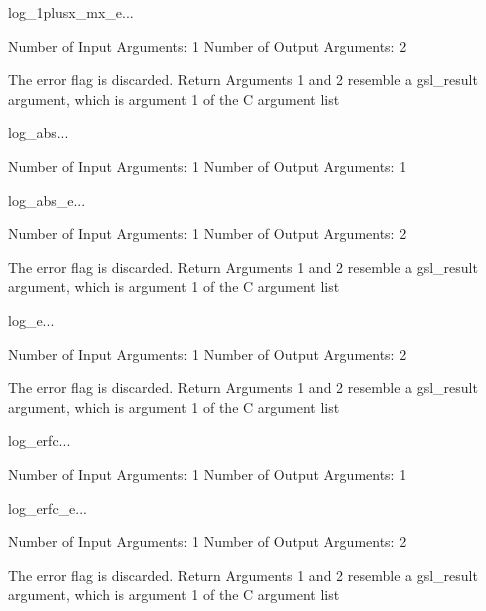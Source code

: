 \begin{funcdesc}{log_1plusx_mx_e}{...}

    Number of Input  Arguments:  1
    Number of Output Arguments:  2

The error flag is discarded.
Return Arguments 1 and 2 resemble a gsl_result argument,
	which is  argument 1 of the C argument list

\end{funcdesc}

\begin{funcdesc}{log_abs}{...}

    Number of Input  Arguments:  1
    Number of Output Arguments:  1
\end{funcdesc}

\begin{funcdesc}{log_abs_e}{...}

    Number of Input  Arguments:  1
    Number of Output Arguments:  2

The error flag is discarded.
Return Arguments 1 and 2 resemble a gsl_result argument,
	which is  argument 1 of the C argument list

\end{funcdesc}

\begin{funcdesc}{log_e}{...}

    Number of Input  Arguments:  1
    Number of Output Arguments:  2

The error flag is discarded.
Return Arguments 1 and 2 resemble a gsl_result argument,
	which is  argument 1 of the C argument list

\end{funcdesc}

\begin{funcdesc}{log_erfc}{...}

    Number of Input  Arguments:  1
    Number of Output Arguments:  1
\end{funcdesc}

\begin{funcdesc}{log_erfc_e}{...}

    Number of Input  Arguments:  1
    Number of Output Arguments:  2

The error flag is discarded.
Return Arguments 1 and 2 resemble a gsl_result argument,
	which is  argument 1 of the C argument list

\end{funcdesc}

